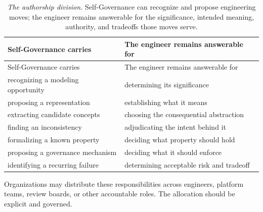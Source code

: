 {\footnotesize
\begin{longtable}[]{@{}
  >{\raggedright\arraybackslash}p{}
  >{\raggedright\arraybackslash}p{}@{}}
\caption[The authorship division]{\emph{The authorship division.} Self-Governance can recognize and propose engineering moves; the engineer remains answerable for the significance, intended meaning, authority, and tradeoffs those moves serve.}\label{authorship-division}\tabularnewline
\toprule\noalign{}
\begin{minipage}[b]{\linewidth}\raggedright
Self-Governance carries
\end{minipage} & \begin{minipage}[b]{\linewidth}\raggedright
The engineer remains answerable for
\end{minipage} \\
\midrule\noalign{}
\endfirsthead
\toprule\noalign{}
\begin{minipage}[b]{\linewidth}\raggedright
Self-Governance carries
\end{minipage} & \begin{minipage}[b]{\linewidth}\raggedright
The engineer remains answerable for
\end{minipage} \\
\midrule\noalign{}
\endhead
\bottomrule\noalign{}
\endlastfoot
recognizing a modeling opportunity & determining its significance \\
proposing a representation & establishing what it means \\
extracting candidate concepts & choosing the consequential abstraction \\
finding an inconsistency & adjudicating the intent behind it \\
formalizing a known property & deciding what property should hold \\
proposing a governance mechanism & deciding what it should enforce \\
identifying a recurring failure & determining acceptable risk and tradeoff \\
\end{longtable}
}


Organizations may distribute these responsibilities across engineers, platform teams, review boards, or other accountable roles. The allocation should be explicit and governed.

